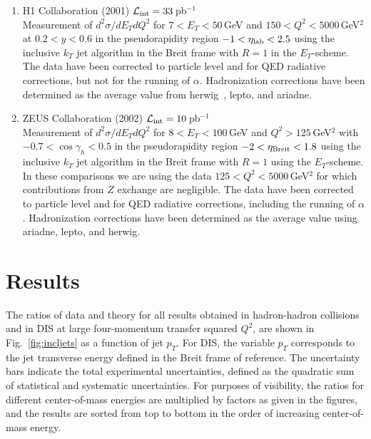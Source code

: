 \documentclass[11pt]{article}
\newcommand{\herwig}{{\sc herwig}}
\newcommand{\ariadne}{{\sc ariadne}}
\newcommand{\lepto}{{\sc lepto}}
\begin{document}
\begin{enumerate}
\begin{enumerate}
\item H1 Collaboration (2001) 
      ${\cal L_{\rm int}}=33\,$pb$^{-1}$~\cite{Adloff:2000tq} \\
Measurement of
$d^2\sigma/dE_T dQ^2$  for $7<E_T<50\,$GeV
    and $150<Q^2<5000\,$GeV$^2$
     at $0.2<y< 0.6$ 
     in the pseudorapidity region $-1<\eta_{\rm lab}<2.5$ 
using the
inclusive $k_T$ jet algorithm in the Breit frame with $R=1$ 
       in the $E_T$-scheme.
The data have been corrected to particle level 
and for QED radiative corrections, 
but not for the running of $\alpha$. 
Hadronization corrections have been determined 
as the average value from \herwig~\cite{Marchesini:1991ch}, 
\lepto, and \ariadne.




\item ZEUS Collaboration (2002) 
      ${\cal L_{\rm int}}=10\,$pb$^{-1}$~\cite{Chekanov:2002be} \\
Measurement of
$d^2\sigma/dE_T dQ^2$  for $8<E_T<100\,$GeV
    and $Q^2>125\,$GeV$^2$
     with $-0.7 <\cos \gamma_h < 0.5$
     in the pseudorapidity region $-2<\eta_{\rm Breit}<1.8$ 
using the
inclusive $k_T$ jet algorithm in the Breit frame with $R=1$ 
       using the $E_T$-scheme.
In these comparisons we are using the data 
$125<Q^2<5000\,$GeV$^2$ for which contributions from $Z$ exchange
are negligible. 
The data have been corrected to particle level 
and for QED radiative corrections, 
including the running of $\alpha$. 
Hadronization corrections have been determined 
as the average value using \ariadne, \lepto, and \herwig.



\end{enumerate}

\end{enumerate}



\newpage
\section{Results}

The ratios of data and theory for all results
obtained in hadron-hadron collisions 
and in DIS at large four-momentum transfer squared $Q^2$,
are shown in Fig.~\ref{fig:incljets} as a function
of jet $p_T$.
For DIS, the variable $p_T$ corresponds to the jet transverse 
energy defined in the Breit frame of reference.
%
The uncertainty bars indicate the total experimental uncertainties,
defined as the quadratic sum of statistical and systematic uncertainties.
For purposes of visibility, the ratios for different 
center-of-mass energies are multiplied by factors as given in the figures,
and the results are sorted from top to bottom
in the order of increasing center-of-mass energy.
\end{document}
